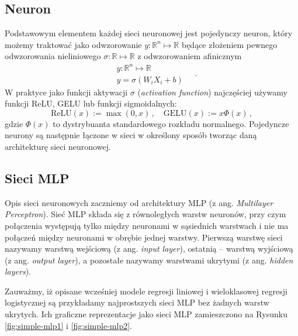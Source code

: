 \documentclass{myclass}
\begin{document}
\subsection{Neuron}

Podstawowym elementem każdej sieci neuronowej jest pojedynczy neuron, który możemy traktować jako
odwzorowanie \(y: \mathbb{R}^n \mapsto \mathbb{R}\) będące złożeniem pewnego odwzorowania
nieliniowego \(\sigma:\mathbb{R} \mapsto \mathbb{R}\) z odwzorowaniem afinicznym
\begin{equation*}
    \begin{split}
        &y: \mathbb{R}^n \mapsto \mathbb{R}\\
        &y = \sigma\left(W_i X_i + b\right)
    \end{split}\quad.
\end{equation*}
W praktyce jako funkcji aktywacji \(\sigma\) (\textit{activation function}) najczęściej używamy
funkcji ReLU, GELU lub funkcji sigmoidalnych:
\begin{equation*}
    \text{ReLU}(x) := \max(0, x)\,,\quad \text{GELU}(x) := x\Phi(x)\,,
\end{equation*}
gdzie \(\Phi(x)\) to dystrybuanta standardowego rozkładu normalnego. Pojedyncze neurony są następnie
łączone w sieci w określony sposób tworząc daną architekturę sieci neuronowej.

\subsection{Sieci MLP}

Opis sieci neuronowych zaczniemy od architektury MLP (z ang. \textit{Multilayer Perceptron}). Sieć
MLP składa się z równoległych warstw neuronów, przy czym połączenia występują tylko między neuronami
w sąsiednich warstwach i nie ma połączeń między neuronami w obrębie jednej warstwy. Pierwszą warstwę
sieci nazywamy warstwą wejściową (z ang. \textit{input layer}), ostatnią -- warstwą wyjściową (z
ang. \textit{output layer}), a pozostałe nazywamy warstwami ukrytymi (z ang. \textit{hidden
layers}).

Zauważmy, iż opisane wcześniej modele regresji liniowej i wieloklasowej regresji logistycznej są
przykładamy najprostszych sieci MLP bez żadnych warstw ukrytych. Ich graficzne reprezentacje jako
sieci MLP zamieszczono na Rysunku \ref{fig:simple-mlp1} i \ref{fig:simple-mlp2}. 
\end{document}
